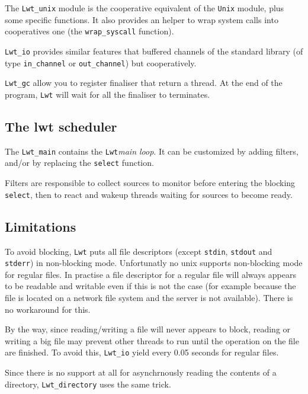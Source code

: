 \documentclass{article}
\newcommand{\lwt}{\texttt{Lwt}\xspace}
\begin{document}
The \texttt{Lwt\_unix} module is the cooperative equivalent of the
\texttt{Unix} module, plus some specific functions. It also provides
an helper to wrap system calls into cooperatives one (the
\texttt{wrap\_syscall} function).

\texttt{Lwt\_io} provides similar features that buffered channels of
the standard library (of type \texttt{in\_channel} or
\texttt{out\_channel}) but cooperatively.

\texttt{Lwt\_gc} allow you to register finaliser that return a
thread. At the end of the program, \lwt will wait for all the
finaliser to terminates.

\subsection{The lwt scheduler}

The \texttt{Lwt\_main} contains the \lwt \emph{main loop}. It can be
customized by adding filters, and/or by replacing the \texttt{select}
function.

Filters are responsible to collect sources to monitor before entering
the blocking \texttt{select}, then to react and wakeup threads waiting
for sources to become ready.

\subsection{Limitations}

To avoid blocking, \lwt puts all file descriptors (except
\texttt{stdin}, \texttt{stdout} and \texttt{stderr}) in non-blocking
mode. Unfortunatly no unix supports non-blocking mode for regular
files. In practise a file descriptor for a regular file will always
appears to be readable and writable even if this is not the case (for
example because the file is located on a network file system and the
server is not available). There is no workaround for this.

By the way, since reading/writing a file will never appears to block,
reading or writing a big file may prevent other threads to run until
the operation on the file are finished. To avoid this,
\texttt{Lwt\_io} yield every 0.05 seconds for regular files.

Since there is no support at all for asynchrnously reading the
contents of a directory, \texttt{Lwt\_directory} uses the same trick.

\end{document}

